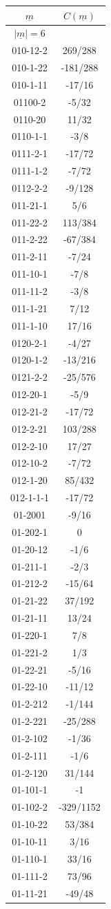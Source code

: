 \begin{tabular}[t]{|cc|}
\hline
$\underline{m}$ & $C(\underline{m})$\\
\hline\hline
$|\underline{m}|=6$&\\
\hline
010-12-2 &  269/288\\
010-1-22 &  -181/288\\
010-1-11 &  -17/16\\
01100-2 &  -5/32\\
0110-20 &  11/32\\
0110-1-1 &  -3/8\\
0111-2-1 &  -17/72\\
0111-1-2 &  -7/72\\
0112-2-2 &  -9/128\\
011-21-1 &  5/6\\
011-22-2 &  113/384\\
011-2-22 &  -67/384\\
011-2-11 &  -7/24\\
011-10-1 &  -7/8\\
011-11-2 &  -3/8\\
011-1-21 &  7/12\\
011-1-10 &  17/16\\
0120-2-1 &  -4/27\\
0120-1-2 &  -13/216\\
0121-2-2 &  -25/576\\
012-20-1 &  -5/9\\
012-21-2 &  -17/72\\
012-2-21 &  103/288\\
012-2-10 &  17/27\\
012-10-2 &  -7/72\\
012-1-20 &  85/432\\
012-1-1-1 &  -17/72\\
01-2001 &  -9/16\\
01-202-1 &  0\\
01-20-12 &  -1/6\\
01-211-1 &  -2/3\\
01-212-2 &  -15/64\\
01-21-22 &  37/192\\
01-21-11 &  13/24\\
01-220-1 &  7/8\\
01-221-2 &  1/3\\
01-22-21 &  -5/16\\
01-22-10 &  -11/12\\
01-2-212 &  -1/144\\
01-2-221 &  -25/288\\
01-2-102 &  -1/36\\
01-2-111 &  -1/6\\
01-2-120 &  31/144\\
01-101-1 &  -1\\
01-102-2 &  -329/1152\\
01-10-22 &  53/384\\
01-10-11 &  3/16\\
01-110-1 &  33/16\\
01-111-2 &  73/96\\
01-11-21 &  -49/48\\
\hline
\end{tabular}
